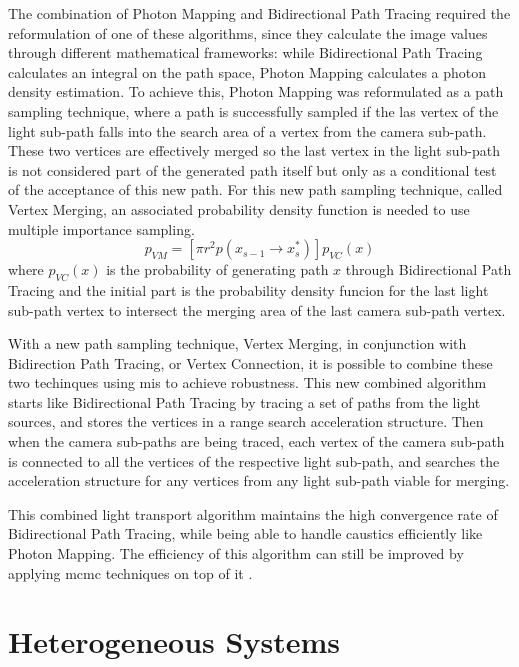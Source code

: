 The combination of Photon Mapping and Bidirectional Path Tracing required the reformulation of one of these algorithms, since they calculate the image values through different mathematical frameworks: while Bidirectional Path Tracing calculates an integral on the path space, Photon Mapping calculates a photon density estimation. To achieve this, Photon Mapping was reformulated as a path sampling technique, where a path is successfully sampled if the las vertex of the light sub-path falls into the search area of a vertex from the camera sub-path. These two vertices are effectively merged so the last vertex in the light sub-path is not considered part of the generated path itself but only as a conditional test of the acceptance of this new path. For this new path sampling technique, called Vertex Merging, an associated probability density function is needed to use multiple importance sampling. 
\begin{equation}
p_{VM}=[\pi r^2 p(x_{s-1}\xrightarrow{}x_{s}^{*})]p_{VC}(x)
\label{eq:pvm}
\end{equation}
where $p_{VC}(x)$ is the probability of generating path $x$ through Bidirectional Path Tracing and the initial part is the probability density funcion for the last light sub-path vertex to intersect the merging area of the last camera sub-path vertex.

With a new path sampling technique, Vertex Merging, in conjunction with Bidirection Path Tracing, or Vertex Connection, it is possible to combine these two techinques using \gls{mis} to achieve robustness. This new combined algorithm starts like Bidirectional Path Tracing by tracing a set of paths from the light sources, and stores the vertices in a range search acceleration structure. Then when the camera sub-paths are being traced, each vertex of the camera sub-path is connected to all the vertices of the respective light sub-path, and searches the acceleration structure for any vertices from any light sub-path viable for merging.

This combined light transport algorithm maintains the high convergence rate of Bidirectional Path Tracing, while being able to handle caustics efficiently like Photon Mapping. The efficiency of this algorithm can still be improved by applying \gls{mcmc} techniques on top of it \citep{Georgiev}.

\section{Heterogeneous Systems}

